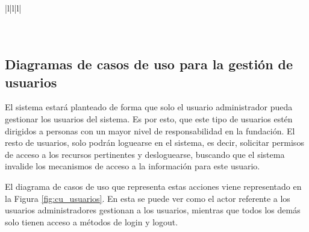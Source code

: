 \begin{table}[H]
{\begin{tabular}{|l|l|l|}
            \hline
                                                                                                                                                                                                                                                                                              \\ 
            \hline
                                                                                                                                                                                                                                    \\ 
            \hline
                                                                                                                                                                 \\
            \hline
        \end{tabular}
    }
    \caption{Descripción del usuario invitado}
\end{table}

\subsection{Diagramas de casos de uso para la gestión de usuarios}

El sistema estará planteado de forma que solo el usuario administrador pueda gestionar los usuarios del sistema. Es por esto, que este tipo de usuarios estén dirigidos a personas con un mayor nivel de responsabilidad en la fundación. El resto de usuarios, solo podrán loguearse en el sistema, es decir, solicitar permisos de acceso a los recursos pertinentes y desloguearse, buscando que el sistema invalide los mecanismos de acceso a la información para este usuario.

El diagrama de casos de uso que representa estas acciones viene representado en la Figura \ref{fig:cu_usuarios}. En esta se puede ver como el actor referente a los usuarios administradores gestionan a los usuarios, mientras que todos los demás solo tienen acceso a métodos de login y logout. 

